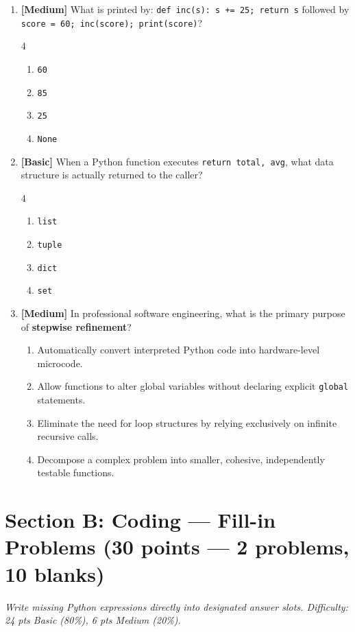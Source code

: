 \documentclass[11pt,a4paper]{article}
\begin{document}
\begin{enumerate}[label=\textbf{Q\arabic*.},leftmargin=1.8em,itemsep=0.7pt,topsep=0.3pt,resume]
\item \textbf{[Medium]} What is printed by: \texttt{def inc(s): s += 25; return s} followed by \texttt{score = 60; inc(score); print(score)}?
\begin{multicols}{4}
\begin{enumerate}[label=\Alph*.]
  \item \texttt{60}
  \item \texttt{85}
  \item \texttt{25}
  \item \texttt{None}
\end{enumerate}
\end{multicols}

\item \textbf{[Basic]} When a Python function executes \texttt{return total, avg}, what data structure is actually returned to the caller?
\begin{multicols}{4}
\begin{enumerate}[label=\Alph*.]
  \item \texttt{list}
  \item \texttt{tuple}
  \item \texttt{dict}
  \item \texttt{set}
\end{enumerate}
\end{multicols}

\item \textbf{[Medium]} In professional software engineering, what is the primary purpose of \textbf{stepwise refinement}?
\begin{enumerate}[label=\Alph*.,leftmargin=1.8em]
  \item Automatically convert interpreted Python code into hardware-level microcode.
  \item Allow functions to alter global variables without declaring explicit \texttt{global} statements.
  \item Eliminate the need for loop structures by relying exclusively on infinite recursive calls.
  \item Decompose a complex problem into smaller, cohesive, independently testable functions.
\end{enumerate}

\end{enumerate}

\vspace{-1.5mm}
\section*{Section B: Coding --- Fill-in Problems \hfill \normalsize\normalfont(30 points --- 2 problems, 10 blanks)}
\textit{Write missing Python expressions directly into designated answer slots. Difficulty: 24 pts Basic (80\%), 6 pts Medium (20\%).}
\end{document}
